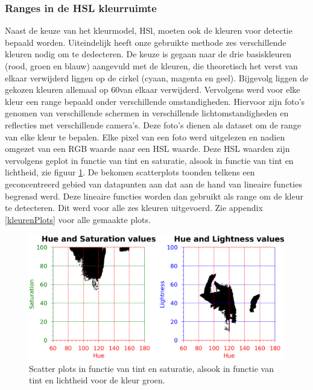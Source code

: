 \subsubsection{Ranges in de HSL kleurruimte} \label{Ranges}
Naast de keuze van het kleurmodel, HSl, moeten ook de kleuren voor detectie bepaald worden. Uiteindelijk heeft onze gebruikte methode zes verschillende kleuren nodig om te dedecteren. De keuze is gegaan naar de drie basiskleuren (rood, groen en blauw) aangevuld met de kleuren, die theoretisch het verst van elkaar verwijderd liggen op de cirkel (cyaan, magenta en geel). Bijgevolg liggen de gekozen kleuren allemaal op 60\degree van elkaar verwijderd. Vervolgens werd voor elke kleur een range bepaald onder verschillende omstandigheden. Hiervoor zijn foto's genomen van verschillende schermen in verschillende lichtomstandigheden en reflecties met verschillende camera's. Deze foto's dienen als dataset om de range van elke kleur te bepalen. Elke pixel van een foto werd uitgelezen en nadien omgezet van een RGB waarde naar een HSL waarde. Deze HSL waarden zijn vervolgens geplot in functie van tint en saturatie, alsook in functie van tint en lichtheid, zie figuur \ref{hslPlot}. De bekomen scatterplots toonden telkens een geconcentreerd gebied van datapunten aan dat aan de hand van lineaire functies begrensd werd. Deze lineaire functies worden dan gebruikt als range om de kleur te detecteren. Dit werd voor alle zes kleuren uitgevoerd. Zie appendix \ref{kleurenPlots} voor alle gemaakte plots. \cite{TSAI20121291}

\begin{figure}[H]
	\center
	\includegraphics[width=\textwidth]{img/hslGreen.png}
	\caption{Scatter plots in functie van tint en saturatie, alsook in functie van tint en lichtheid voor de kleur groen.}
	\label{hslPlot}
\end{figure}

